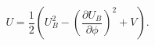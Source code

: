 \begin{equation}
U=\frac{1}{2}\left(U_B^2-\left(\frac{\partial U_B}{\partial \phi}\right)^2+V\right).
\end{equation}

